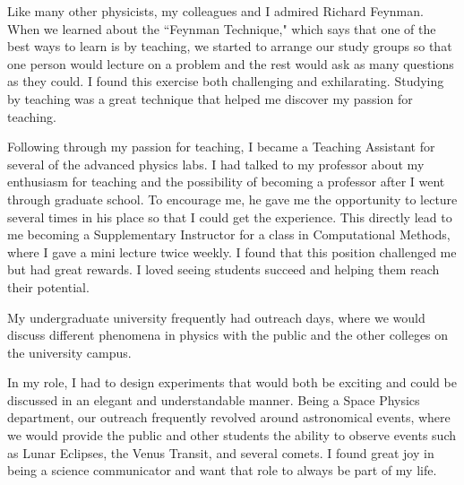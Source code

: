 \documentclass[12pt]{article}
\begin{document}
Like many other physicists, my colleagues and I admired Richard Feynman. When we
learned about the ``Feynman Technique," which says that one of the best ways to
learn is by teaching, we started to arrange our study groups so that one person
would lecture on a problem and the rest would ask as many questions as they
could. I found this exercise both challenging and exhilarating. Studying by
teaching was a great technique that helped me discover my passion for teaching.

Following through my passion for teaching, I became a Teaching Assistant for
several of the advanced physics labs. I had talked to my professor about my
enthusiasm for teaching and the possibility of becoming a professor after I went
through graduate school. To encourage me, he gave me the opportunity to lecture
several times in his place so that I could get the experience. This directly
lead to me becoming a Supplementary Instructor for a class in Computational
Methods, where I gave a mini lecture twice weekly. I found that this position
challenged me but had great rewards. I loved seeing students succeed and helping
them reach their potential. 

My undergraduate university frequently had outreach days, where we would discuss
different phenomena in physics with the public and the other colleges on the
university campus.

In my role, I had to design experiments that would both be exciting and could be
discussed in an elegant and understandable manner. Being a Space Physics
department, our outreach frequently revolved around astronomical events, where
we would provide the public and other students the ability to observe events
such as Lunar Eclipses, the Venus Transit, and several comets. I found great joy
in being a science communicator and want that role to always be part of my life. 
\end{document}
